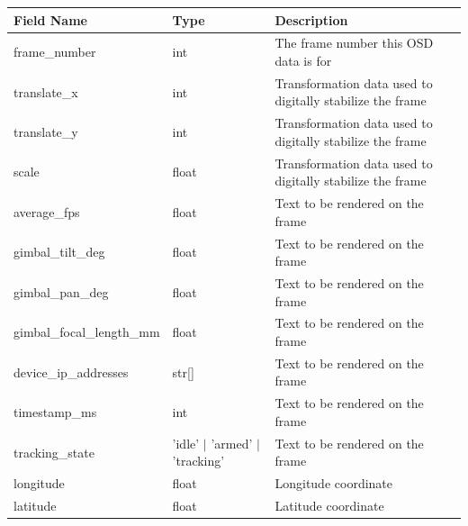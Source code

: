 \documentclass[12pt, titlepage]{article}
\begin{document}
\begin{center}
  \begin{tabular}{p{4cm} p{3cm} p{8cm}}
    \toprule
    \textbf{Field Name}       & \textbf{Type}                     & \textbf{Description}                                      \\
    \midrule
    frame\_number             & int                               & The frame number this OSD data is for                     \\
    translate\_x              & int                               & Transformation data used to digitally stabilize the frame \\
    translate\_y              & int                               & Transformation data used to digitally stabilize the frame \\
    scale                     & float                             & Transformation data used to digitally stabilize the frame \\
    average\_fps              & float                             & Text to be rendered on the frame                          \\
    gimbal\_tilt\_deg         & float                             & Text to be rendered on the frame                          \\
    gimbal\_pan\_deg          & float                             & Text to be rendered on the frame                          \\
    gimbal\_focal\_length\_mm & float                             & Text to be rendered on the frame                          \\
    device\_ip\_addresses     & str[]                             & Text to be rendered on the frame                          \\
    timestamp\_ms             & int                               & Text to be rendered on the frame                          \\
    tracking\_state           & 'idle' $|$ 'armed' $|$ 'tracking' & Text to be rendered on the frame                          \\
    longitude                 & float                             & Longitude coordinate                                      \\
    latitude                  & float                             & Latitude coordinate                                       \\
    \bottomrule
  \end{tabular}
\end{center}
\end{document}

